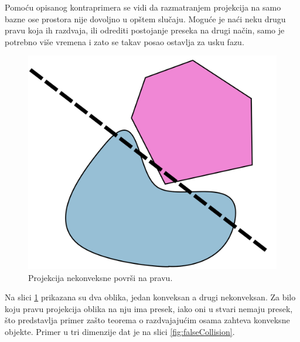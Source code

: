\documentclass[12pt,oneside]{memoir}
\begin{document}
Pomoću opisanog kontraprimera se vidi da razmatranjem projekcija na samo bazne ose prostora nije dovoljno
u opštem slučaju. Moguće je naći neku drugu pravu koja ih razdvaja, ili odrediti postojanje preseka na drugi način, 
samo je potrebno više vremena i zato se takav posao ostavlja za usku fazu.

\begin{figure}[h!]
	\begin{center}
	\includegraphics[scale=0.17]{theorem_counterexample.png}
	\end{center}
	\caption{Projekcija nekonveksne površi na pravu.}
	\label{fig:counter}
\end{figure}

Na slici \ref{fig:counter} prikazana su dva oblika, jedan konveksan a drugi nekonveksan. 
Za bilo koju pravu projekcija oblika na nju ima presek, iako oni u stvari nemaju presek, što predstavlja
primer zašto teorema o razdvajajućim osama zahteva konveksne objekte. 
Primer u tri dimenzije dat je na slici \ref{fig:falseCollision}.
\end{document}
